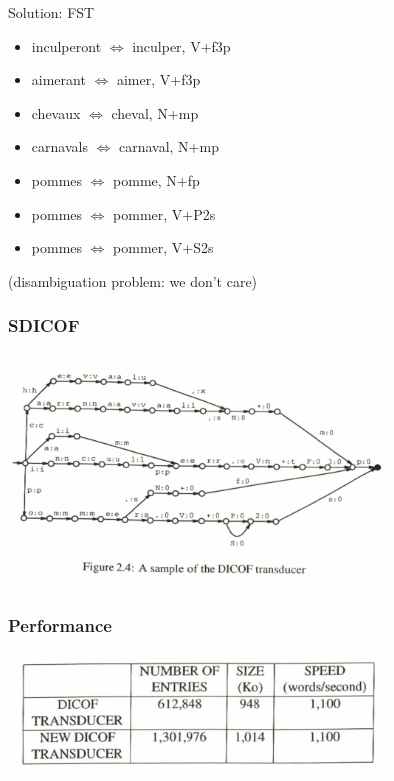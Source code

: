 \documentclass[10pt]{beamer}
\begin{document}
\begin{frame}[fragile]{Solution: FST}

  \begin{itemize}
  \item inculperont $\iff$ inculper, V+f3p

  \item aimerant $\iff$ aimer, V+f3p

  \item chevaux $\iff$ cheval, N+mp

  \item carnavals $\iff$ carnaval, N+mp

  \item pommes $\iff$ pomme, N+fp

  \item pommes $\iff$ pommer, V+P2s

  \item pommes $\iff$ pommer, V+S2s

  \end{itemize}
  

  \pause

  (disambiguation problem: we don't care)

\end{frame}


\begin{frame}[fragile]
  \frametitle{SDICOF}

  \centerline{\includegraphics[width=10cm]{fig24.png}}

\end{frame}

\begin{frame}[fragile]
  \frametitle{Performance}

  \centerline{\includegraphics[width=10cm]{dicofperformance.png}}
\end{frame}
\end{document}
